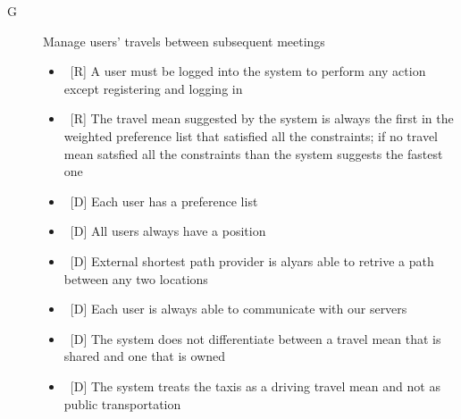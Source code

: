 \begin{description}
\item[G\thecountReq] Manage users’ travels between subsequent meetings

\begin{itemize}
\item~[R] A user must be logged into the system to perform any action except registering and logging in
\item~[R] The travel mean suggested by the system is always the first in the weighted preference list that satisfied all the constraints; if no travel mean satsfied all the constraints than the system suggests the fastest one
\end{itemize}

\begin{itemize}
\item~[D] Each user has a preference list
\item~[D] All users always have a position
\item~[D] External shortest path provider is alyars able to retrive a path between any two locations
\item~[D] Each user is always able to communicate with our servers
\item~[D] The system does not differentiate between a travel mean that is shared and one that is owned
\item~[D] The system treats the taxis as a driving travel mean and not as public transportation
\end{itemize}
\end{description}
